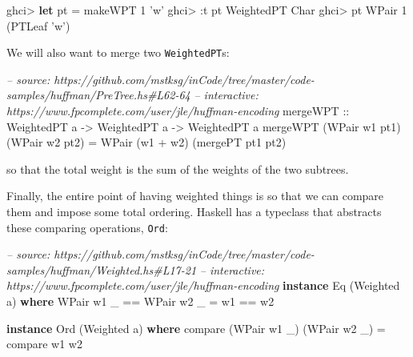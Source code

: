 \documentclass[]{article}
\newenvironment{Shaded}{}{}
\newcommand{\KeywordTok}[1]{\textcolor[rgb]{0.00,0.44,0.13}{\textbf{#1}}}
\newcommand{\DataTypeTok}[1]{\textcolor[rgb]{0.56,0.13,0.00}{#1}}
\newcommand{\DecValTok}[1]{\textcolor[rgb]{0.25,0.63,0.44}{#1}}
\newcommand{\CharTok}[1]{\textcolor[rgb]{0.25,0.44,0.63}{#1}}
\newcommand{\CommentTok}[1]{\textcolor[rgb]{0.38,0.63,0.69}{\textit{#1}}}
\newcommand{\OtherTok}[1]{\textcolor[rgb]{0.00,0.44,0.13}{#1}}
\newcommand{\FunctionTok}[1]{\textcolor[rgb]{0.02,0.16,0.49}{#1}}
\newcommand{\NormalTok}[1]{#1}
\begin{document}
\begin{Shaded}
\begin{Highlighting}[]
\NormalTok{ghci}\FunctionTok{>} \KeywordTok{let}\NormalTok{ pt }\FunctionTok{=}\NormalTok{ makeWPT }\DecValTok{1} \CharTok{'w'}
\NormalTok{ghci}\FunctionTok{>} \FunctionTok{:}\NormalTok{t pt}
\DataTypeTok{WeightedPT} \DataTypeTok{Char}
\NormalTok{ghci}\FunctionTok{>}\NormalTok{ pt}
\DataTypeTok{WPair} \DecValTok{1}\NormalTok{ (}\DataTypeTok{PTLeaf} \CharTok{'w'}\NormalTok{)}
\end{Highlighting}
\end{Shaded}

We will also want to merge two \texttt{WeightedPT}s:

\begin{Shaded}
\begin{Highlighting}[]
\CommentTok{-- source: https://github.com/mstksg/inCode/tree/master/code-samples/huffman/PreTree.hs#L62-64}
\CommentTok{-- interactive: https://www.fpcomplete.com/user/jle/huffman-encoding}
\OtherTok{mergeWPT ::} \DataTypeTok{WeightedPT}\NormalTok{ a }\OtherTok{->} \DataTypeTok{WeightedPT}\NormalTok{ a }\OtherTok{->} \DataTypeTok{WeightedPT}\NormalTok{ a}
\NormalTok{mergeWPT (}\DataTypeTok{WPair}\NormalTok{ w1 pt1) (}\DataTypeTok{WPair}\NormalTok{ w2 pt2)}
    \FunctionTok{=} \DataTypeTok{WPair}\NormalTok{ (w1 }\FunctionTok{+}\NormalTok{ w2) (mergePT pt1 pt2)}
\end{Highlighting}
\end{Shaded}

so that the total weight is the sum of the weights of the two subtrees.

Finally, the entire point of having weighted things is so that we can compare
them and impose some total ordering. Haskell has a typeclass that abstracts
these comparing operations, \texttt{Ord}:

\begin{Shaded}
\begin{Highlighting}[]
\CommentTok{-- source: https://github.com/mstksg/inCode/tree/master/code-samples/huffman/Weighted.hs#L17-21}
\CommentTok{-- interactive: https://www.fpcomplete.com/user/jle/huffman-encoding}
\KeywordTok{instance} \DataTypeTok{Eq}\NormalTok{ (}\DataTypeTok{Weighted}\NormalTok{ a) }\KeywordTok{where}
    \DataTypeTok{WPair}\NormalTok{ w1 _ }\FunctionTok{==} \DataTypeTok{WPair}\NormalTok{ w2 _ }\FunctionTok{=}\NormalTok{ w1 }\FunctionTok{==}\NormalTok{ w2}

\KeywordTok{instance} \DataTypeTok{Ord}\NormalTok{ (}\DataTypeTok{Weighted}\NormalTok{ a) }\KeywordTok{where}
\NormalTok{    compare (}\DataTypeTok{WPair}\NormalTok{ w1 _) (}\DataTypeTok{WPair}\NormalTok{ w2 _) }\FunctionTok{=}\NormalTok{ compare w1 w2}
\end{Highlighting}
\end{Shaded}
\end{document}

